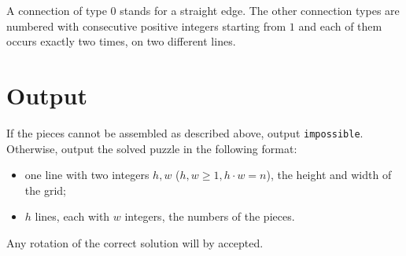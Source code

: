 A connection of type $0$ stands for a straight edge.
The other connection types are numbered with consecutive positive
integers starting from $1$ and each of them occurs exactly two times,
on two different lines.

\section*{Output}

If the pieces cannot be assembled as described above, output
\texttt{impossible}. Otherwise, output the solved puzzle in the
following format:
\begin{itemize}
  \item one line with two integers $h,w$ ($h,w \ge 1, h \cdot w = n$),
    the height and width of the grid;
  \item $h$ lines, each with $w$ integers, the numbers of the pieces.
\end{itemize}
Any rotation of the correct solution will by accepted.
